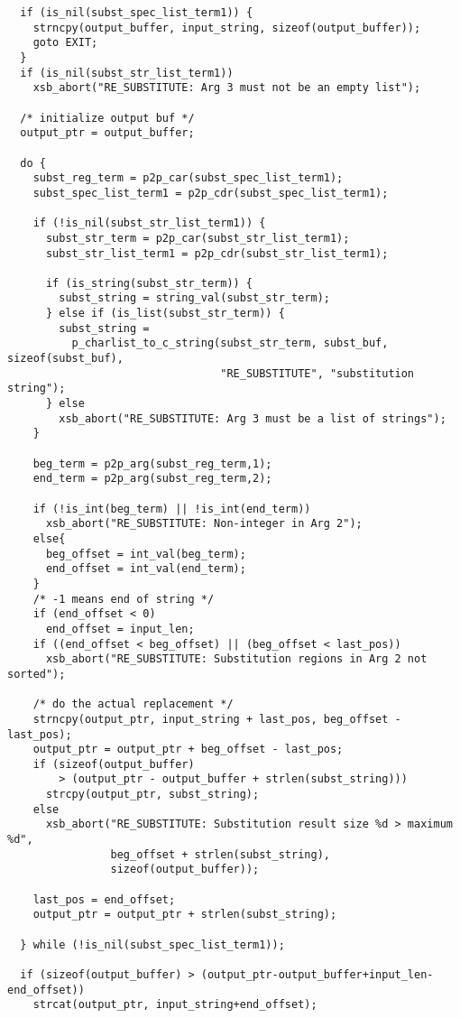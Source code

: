 {\begin{verbatim}
  if (is_nil(subst_spec_list_term1)) {
    strncpy(output_buffer, input_string, sizeof(output_buffer));
    goto EXIT;
  }
  if (is_nil(subst_str_list_term1))
    xsb_abort("RE_SUBSTITUTE: Arg 3 must not be an empty list");

  /* initialize output buf */
  output_ptr = output_buffer;

  do {
    subst_reg_term = p2p_car(subst_spec_list_term1);
    subst_spec_list_term1 = p2p_cdr(subst_spec_list_term1);

    if (!is_nil(subst_str_list_term1)) {
      subst_str_term = p2p_car(subst_str_list_term1);
      subst_str_list_term1 = p2p_cdr(subst_str_list_term1);

      if (is_string(subst_str_term)) {
        subst_string = string_val(subst_str_term);
      } else if (is_list(subst_str_term)) {
        subst_string =
          p_charlist_to_c_string(subst_str_term, subst_buf, sizeof(subst_buf),
                                 "RE_SUBSTITUTE", "substitution string");
      } else 
        xsb_abort("RE_SUBSTITUTE: Arg 3 must be a list of strings");
    }

    beg_term = p2p_arg(subst_reg_term,1);
    end_term = p2p_arg(subst_reg_term,2);

    if (!is_int(beg_term) || !is_int(end_term))
      xsb_abort("RE_SUBSTITUTE: Non-integer in Arg 2");
    else{
      beg_offset = int_val(beg_term);
      end_offset = int_val(end_term);
    }
    /* -1 means end of string */
    if (end_offset < 0)
      end_offset = input_len;
    if ((end_offset < beg_offset) || (beg_offset < last_pos))
      xsb_abort("RE_SUBSTITUTE: Substitution regions in Arg 2 not sorted");

    /* do the actual replacement */
    strncpy(output_ptr, input_string + last_pos, beg_offset - last_pos);
    output_ptr = output_ptr + beg_offset - last_pos;
    if (sizeof(output_buffer)
        > (output_ptr - output_buffer + strlen(subst_string)))
      strcpy(output_ptr, subst_string);
    else
      xsb_abort("RE_SUBSTITUTE: Substitution result size %d > maximum %d",
                beg_offset + strlen(subst_string),
                sizeof(output_buffer));
    
    last_pos = end_offset;
    output_ptr = output_ptr + strlen(subst_string);

  } while (!is_nil(subst_spec_list_term1));

  if (sizeof(output_buffer) > (output_ptr-output_buffer+input_len-end_offset))
    strcat(output_ptr, input_string+end_offset);


\end{verbatim}}
